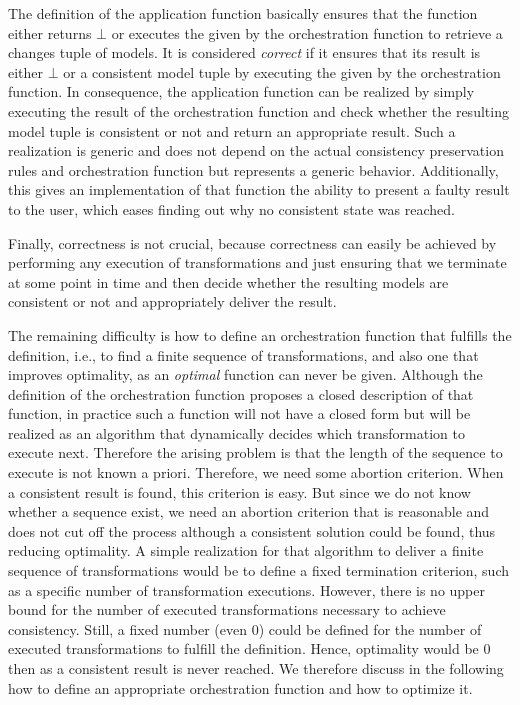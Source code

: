 The definition of the application function basically ensures that the function either returns $\bot$ or executes the \modellevelconsistencypreservationrules given by the orchestration function to retrieve a changes tuple of models.
It is considered \emph{correct} if it ensures that its result is either $\bot$ or a consistent model tuple by executing the \modellevelconsistencypreservationrules given by the orchestration function.
In consequence, the application function can be realized by simply executing the result of the orchestration function and check whether the resulting model tuple is consistent or not and return an appropriate result.
Such a realization is generic and does not depend on the actual consistency preservation rules and orchestration function but represents a generic behavior.
Additionally, this gives an implementation of that function the ability to present a faulty result to the user, which eases finding out why no consistent state was reached.

Finally, correctness is not crucial, because correctness can easily be achieved by performing any execution of transformations and just ensuring that we terminate at some point in time and then decide whether the resulting models are consistent or not and appropriately deliver the result.

The remaining difficulty is how to define an orchestration function that fulfills the definition, i.e., to find a finite sequence of transformations, and also one that improves optimality, as an \emph{optimal} function can never be given.
Although the definition of the orchestration function proposes a closed description of that function, in practice such a function will not have a closed form but will be realized as an algorithm that dynamically decides which transformation to execute next.
Therefore the arising problem is that the length of the sequence to execute is not known a priori. Therefore, we need some abortion criterion. When a consistent result is found, this criterion is easy. But since we do not know whether a sequence exist, we need an abortion criterion that is reasonable and does not cut off the process although a consistent solution could be found, thus reducing optimality.
A simple realization for that algorithm to deliver a finite sequence of transformations would be to define a fixed termination criterion, such as a specific number of transformation executions. However, there is no upper bound for the number of executed transformations necessary to achieve consistency. Still, a fixed number (even 0) could be defined for the number of executed transformations to fulfill the definition. Hence, optimality would be 0 then as a consistent result is never reached. We therefore discuss in the following how to define an appropriate orchestration function and how to optimize it.

